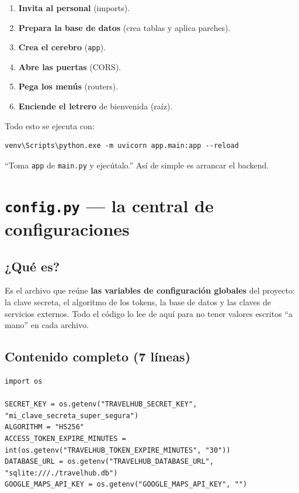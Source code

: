 \documentclass[11pt,a4paper]{article}
\begin{document}
\begin{enumerate}
    \item \textbf{Invita al personal} (imports).
    \item \textbf{Prepara la base de datos} (crea tablas y aplica parches).
    \item \textbf{Crea el cerebro} (\texttt{app}).
    \item \textbf{Abre las puertas} (CORS).
    \item \textbf{Pega los menús} (routers).
    \item \textbf{Enciende el letrero} de bienvenida (raíz).
\end{enumerate}

Todo esto se ejecuta con:

\begin{lstlisting}
venv\Scripts\python.exe -m uvicorn app.main:app --reload
\end{lstlisting}

\begin{recuadro}
``Toma \texttt{app} de \texttt{main.py} y ejecútalo.'' Así de simple es arrancar el backend.
\end{recuadro}

\section{\texttt{config.py} --- la central de configuraciones}

\subsection{¿Qué es?}

Es el archivo que reúne \textbf{las variables de configuración globales} del proyecto:
la clave secreta, el algoritmo de los tokens, la base de datos y las claves de servicios externos.
Todo el código lo lee de aquí para no tener valores escritos ``a mano'' en cada archivo.

\subsection{Contenido completo (7 líneas)}

\begin{lstlisting}
import os

SECRET_KEY = os.getenv("TRAVELHUB_SECRET_KEY", "mi_clave_secreta_super_segura")
ALGORITHM = "HS256"
ACCESS_TOKEN_EXPIRE_MINUTES = int(os.getenv("TRAVELHUB_TOKEN_EXPIRE_MINUTES", "30"))
DATABASE_URL = os.getenv("TRAVELHUB_DATABASE_URL", "sqlite:///./travelhub.db")
GOOGLE_MAPS_API_KEY = os.getenv("GOOGLE_MAPS_API_KEY", "")
\end{lstlisting}
\end{document}
